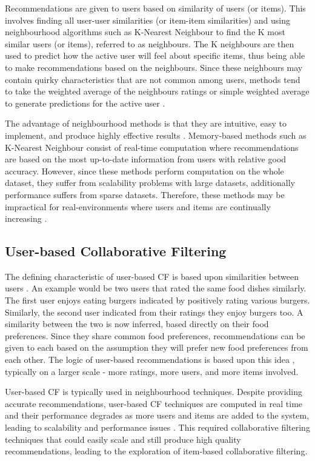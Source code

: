 Recommendations are given to users based on similarity of users (or items). This involves finding all user-user similarities (or item-item similarities) and using neighbourhood algorithms such as K-Nearest Neighbour to find the K most similar users (or items), referred to as neighbours. The K neighbours are then used to predict how the active user will feel about specific items, thus being able to make recommendations based on the neighbours. Since these neighbours may contain quirky characteristics that are not common among users, methods tend to take the weighted average of the neighbours ratings or simple weighted average to generate predictions for the active user \cite{survey}. 

The advantage of neighbourhood methods is that they are intuitive, easy to implement, and produce highly effective results \cite{survey, scalable,zeng2003similarity}. Memory-based methods such as K-Nearest Neighbour consist of real-time computation where recommendations are based on the most up-to-date information from users with relative good accuracy. However, since these methods perform computation on the whole dataset, they suffer from scalability problems with large datasets, additionally performance suffers from sparse datasets. Therefore, these methods may be impractical for real-environments where users and items are continually increasing \cite{zeng2003similarity}. 

\subsection{User-based Collaborative Filtering}

The defining characteristic of user-based CF is based upon similarities between users \cite{mahoutaction}. An example would be two users that rated the same food dishes similarly. The first user enjoys eating burgers indicated by positively rating various burgers. Similarly, the second user indicated from their ratings they enjoy burgers too. A similarity between the two is now inferred, based directly on their food preferences. Since they share common food preferences, recommendations can be given to each based on the assumption they will prefer new food preferences from each other. The logic of user-based recommendations is based upon this idea \cite{mahoutaction}, typically on a larger scale - more ratings, more users, and more items involved. 

User-based CF is typically used in neighbourhood techniques. Despite providing accurate recommendations, user-based CF techniques are computed in real time and their performance degrades as more users and items are added to the system, leading to scalability and performance issues \cite{dimension, itembased, evaluationitem}. This required collaborative filtering techniques that could easily scale and still produce high quality recommendations, leading to the exploration of item-based collaborative filtering.
 
